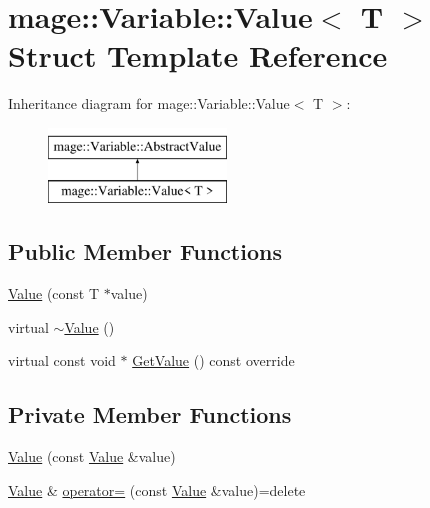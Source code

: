 \hypertarget{structmage_1_1_variable_1_1_value}{}\section{mage\+:\+:Variable\+:\+:Value$<$ T $>$ Struct Template Reference}
\label{structmage_1_1_variable_1_1_value}
Inheritance diagram for mage\+:\+:Variable\+:\+:Value$<$ T $>$\+:\begin{figure}[H]
\begin{center}
\leavevmode
\includegraphics[height=2.000000cm]{structmage_1_1_variable_1_1_value}
\end{center}
\end{figure}
\subsection*{Public Member Functions}
\begin{DoxyCompactItemize}
\item 
\hyperlink{structmage_1_1_variable_1_1_value_a1e29cc5eaeb8356a11a1eca0232cf162}{Value} (const T $\ast$value)
\item 
virtual \hyperlink{structmage_1_1_variable_1_1_value_ab0b88d59c1049b89557fbaf649a3b459}{$\sim$\+Value} ()
\item 
virtual const void $\ast$ \hyperlink{structmage_1_1_variable_1_1_value_a04d70496ebb7ad71dafa3df877daeb26}{Get\+Value} () const override
\end{DoxyCompactItemize}
\subsection*{Private Member Functions}
\begin{DoxyCompactItemize}
\item 
\hyperlink{structmage_1_1_variable_1_1_value_a083583e9c9c59eae659db2bfdf4b6629}{Value} (const \hyperlink{structmage_1_1_variable_1_1_value}{Value} \&value)
\item 
\hyperlink{structmage_1_1_variable_1_1_value}{Value} \& \hyperlink{structmage_1_1_variable_1_1_value_a19c45282edac9ffaa0f687b7dd414392}{operator=} (const \hyperlink{structmage_1_1_variable_1_1_value}{Value} \&value)=delete
\end{DoxyCompactItemize}
